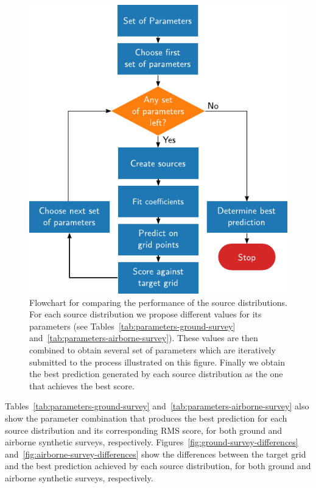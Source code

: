 \documentclass[twocolumn]{article}
\begin{document}
\begin{figure}
    \includegraphics[width=\linewidth]{figs/flowchart.pdf}
    \caption{
        Flowchart for comparing the performance of the source distributions.
        For each source distribution we propose different values for its
        parameters (see Tables~\ref{tab:parameters-ground-survey}
        and~\ref{tab:parameters-airborne-survey}).
        These values are then combined to obtain several set of parameters
        which are iteratively submitted to the process illustrated on this
        figure.
        Finally we obtain the best prediction generated by each source
        distribution as the one that achieves the best score.
    }
    \label{fig:flowchart}
\end{figure}


Tables~\ref{tab:parameters-ground-survey}
and~\ref{tab:parameters-airborne-survey} also show the parameter combination
that produces the best prediction for each source distribution and its
corresponding RMS score, for both ground and airborne synthetic surveys,
respectively.
Figures~\ref{fig:ground-survey-differences}
and~\ref{fig:airborne-survey-differences} show the differences between the
target grid and the best prediction achieved by each source distribution, for
both ground and airborne synthetic surveys, respectively.
\end{document}
